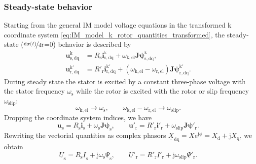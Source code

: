 \begin{frame}
	\frametitle{Steady-state behavior}
    Starting from the general IM model voltage equations in the transformed k coordinate system \eqref{eq:IM_model_k_rotor_quantities_transformed}, the steady-state ($\nicefrac{\mathrm{d}x(t)}{\mathrm{d}t}$=0) behavior is described by
    \begin{equation}
        \begin{alignedat}{2}
            \bm{u}^\mathrm{k}_\mathrm{s,dq} &= R_\mathrm{s} \bm{i}^\mathrm{k}_\mathrm{s,dq} + \omega_\mathrm{k,el}\bm{J} \bm{\psi}^\mathrm{k}_\mathrm{s,dq},\\
            \bm{u}^\mathrm{k'}_\mathrm{r,dq} &= R'_\mathrm{r} \bm{i}^\mathrm{k'}_\mathrm{r,dq} +\left(\omega_\mathrm{k,el}-\omega_\mathrm{r,el}\right)\bm{J}\bm{\psi}^\mathrm{k'}_\mathrm{r,dq}.
        \end{alignedat}
    \end{equation}
    \pause
    During steady state the stator is excited by a constant three-phase voltage with the stator frequency $\omega_\mathrm{s}$ while the rotor is excited with the rotor  or slip frequency $\omega_\mathrm{slip}$:
    \begin{equation}
        \omega_\mathrm{k,el} \rightarrow \omega_\mathrm{s}, \qquad \omega_\mathrm{k,el}-\omega_\mathrm{r,el} \rightarrow \omega_\mathrm{slip}.
    \end{equation}
    \pause Dropping the coordinate system indices, we have
    \begin{equation}
            \bm{u}_\mathrm{s} = R_\mathrm{s} \bm{i}_\mathrm{s} + \omega_\mathrm{s}\bm{J} \bm{\psi}_\mathrm{s},\qquad
            \bm{u}'_\mathrm{r} = R'_\mathrm{r} \bm{i}'_\mathrm{r} +\omega_\mathrm{slip}\bm{J}\bm{\psi}'_\mathrm{r}.
    \end{equation}
    \pause
    Rewriting the vectorial quantities as complex phasors $\underline{X}_\mathrm{dq} = X e^{\mathrm{j}\phi}=X_\mathrm{d} + \mathrm{j} X_\mathrm{q}$, we obtain
    \begin{equation}
            \underline{U}_\mathrm{s} = R_\mathrm{s} \underline{I}_\mathrm{s} + \mathrm{j}\omega_\mathrm{s}\underline{\Psi}_\mathrm{s},\qquad
            \underline{U}'_\mathrm{r} = R'_\mathrm{r} \underline{I}'_\mathrm{r} +\mathrm{j}\omega_\mathrm{slip}\underline{\Psi}'_\mathrm{r}.
        \label{eq:IM_model_voltage_equations_steady_state}
    \end{equation}
\end{frame}

